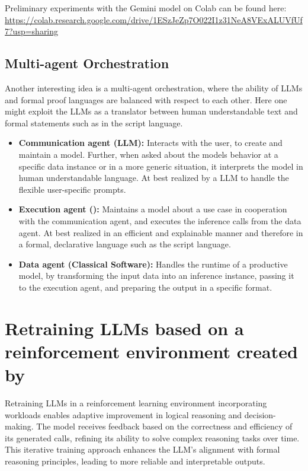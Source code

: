 \documentclass[aps,onecolumn,nofootinbib,pra]{article}
\begin{document}
Preliminary experiments with the Gemini model on Colab can be found here:
\url{https://colab.research.google.com/drive/1ESzJeZp7O022I1z31NeA8VExALUVfUf7?usp=sharing}

\subsection{Multi-agent Orchestration}

Another interesting idea is a multi-agent orchestration, where the ability of LLMs and formal proof languages are balanced with respect to each other.
Here one might exploit the LLMs as a translator between human understandable text and formal statements such as in the \tnreason{} script language.
\begin{itemize}
	\item \textbf{Communication agent (LLM):}
		Interacts with the user, to create and maintain a \tnreason{} model.
		Further, when asked about the models behavior at a specific data instance or in a more generic situation, it interprets the model in human understandable language.
		At best realized by a LLM to handle the flexible user-specific prompts.
	\item \textbf{Execution agent (\tnreason{}):}
		Maintains a model about a use case in cooperation with the communication agent, and executes the inference calls from the data agent.
		At best realized in an efficient and explainable manner and therefore in a formal, declarative language such as the \tnreason{} script language.
	\item \textbf{Data agent (Classical Software):}
		Handles the runtime of a productive model, by transforming the input data into an inference instance, passing it to the execution agent, and preparing the output in a specific format.
\end{itemize}

\section{Retraining LLMs based on a reinforcement environment created by \tnreason{}}

Retraining LLMs in a reinforcement learning environment incorporating \tnreason{} workloads enables adaptive improvement in logical reasoning and decision-making.
The model receives feedback based on the correctness and efficiency of its generated \tnreason{} calls, refining its ability to solve complex reasoning tasks over time.
This iterative training approach enhances the LLM’s alignment with formal reasoning principles, leading to more reliable and interpretable outputs.
\end{document}

